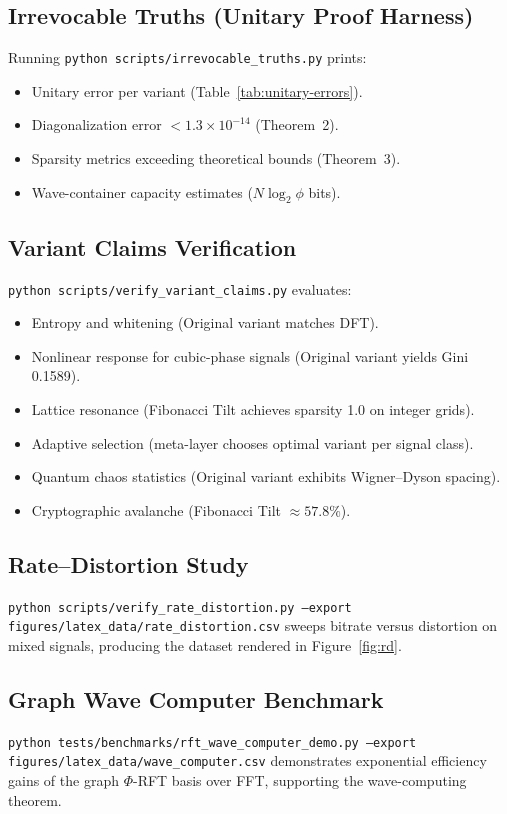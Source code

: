\documentclass[11pt,a4paper]{article}
\begin{document}
\subsection{Irrevocable Truths (Unitary Proof Harness)}
Running \texttt{python scripts/irrevocable\_truths.py} prints:

\begin{itemize}
    \item Unitary error per variant (Table~\ref{tab:unitary-errors}).
    \item Diagonalization error $< 1.3 \times 10^{-14}$ (Theorem~2).
    \item Sparsity metrics exceeding theoretical bounds (Theorem~3).
    \item Wave-container capacity estimates ($N \log_2 \phi$ bits).
\end{itemize}

\subsection{Variant Claims Verification}
\texttt{python scripts/verify\_variant\_claims.py} evaluates:

\begin{itemize}
    \item Entropy and whitening (Original variant matches DFT).
    \item Nonlinear response for cubic-phase signals (Original variant yields Gini 0.1589).
    \item Lattice resonance (Fibonacci Tilt achieves sparsity 1.0 on integer grids).
    \item Adaptive selection (meta-layer chooses optimal variant per signal class).
    \item Quantum chaos statistics (Original variant exhibits Wigner--Dyson spacing).
    \item Cryptographic avalanche (Fibonacci Tilt $\approx 57.8\%$).
\end{itemize}

\subsection{Rate--Distortion Study}
\texttt{python scripts/verify\_rate\_distortion.py --export figures/latex\_data/rate\_distortion.csv} sweeps bitrate versus distortion on mixed signals, producing the dataset rendered in Figure~\ref{fig:rd}.

\subsection{Graph Wave Computer Benchmark}
\texttt{python tests/benchmarks/rft\_wave\_computer\_demo.py --export figures/latex\_data/wave\_computer.csv} demonstrates exponential efficiency gains of the graph $\Phi$-RFT basis over FFT, supporting the wave-computing theorem.
\end{document}
